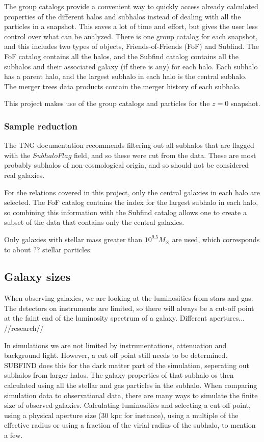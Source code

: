 The group catalogs provide a convenient way to quickly access already calculated properties of the different halos and subhalos instead of dealing with all the particles in a snapshot. This saves a lot of time and effort, but gives the user less control over what can be analyzed. There is one group catalog for each snapshot, and this includes two types of objects, Friends-of-Friends (FoF) and Subfind. The FoF catalog contains all the halos, and the Subfind catalog contains all the subhalos and their associated galaxy (if there is any) for each halo. Each subhalo has a parent halo, and the largest subhalo in each halo is the central subhalo. The merger trees data products contain the merger history of each subhalo.

This project makes use of the group catalogs and particles for the $z = 0$ snapshot.

\subsubsection{Sample reduction}

The TNG documentation recommends filtering out all subhalos that are flagged with the $SubhaloFlag$ field, and so these were cut from the data. These are most probably subhalos of non-cosmological origin, and so should not be considered real galaxies.

For the relations covered in this project, only the central galaxies in each halo are selected. The FoF catalog contains the index for the largest subhalo in each halo, so combining this information with the Subfind catalog allows one to create a subset of the data that contains only the central galaxies.

Only galaxies with stellar mass greater than $10^{9.5} M_{\odot}$ are used, which corresponds to about ?? stellar particles.

\subsection{Galaxy sizes}
When observing galaxies, we are looking at the luminosities from stars and gas. The detectors on instruments are limited, so there will always be a cut-off point at the faint end of the luminosity spectrum of a galaxy. Different apertures... //research//

In simulations we are not limited by instrumentations, attenuation and background light. However, a cut off point still needs to be determined. SUBFIND does this for the dark matter part of the simulation, seperating out subhalos from larger halos. The galaxy properties of that subhalo os then calculated using all the stellar and gas particles in the subhalo. When comparing simulation data to observational data, there are many ways to simulate the finite size of observed galaxies. Calculating luminosities and selecting a cut off point, using a physical aperture size (30 kpc for instance), using a multiple of the effective radius or using a fraction of the virial radius of the subhalo, to mention a few.

